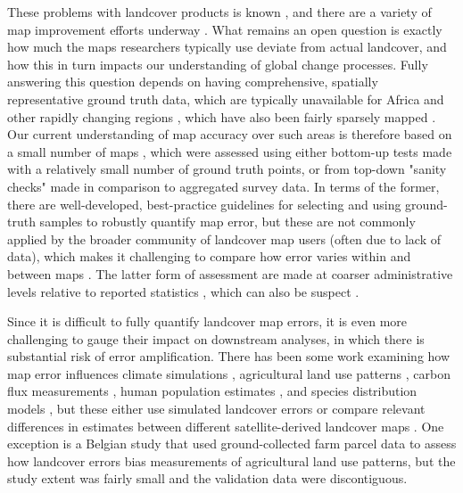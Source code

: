 \documentclass{pnastwo2}
\begin{document}
\begin{article}
These problems with landcover products is known \cite{fritz_comparison_2010, fritz_cropland_2011, see_improved_2015, fritz_mapping_2015,verburg_challenges_2011}, and there are a variety of map improvement efforts underway \cite[e.g.][]{fritz_geo-wiki:_2012, estes_platform_2015}. What remains an open question is exactly how much the maps researchers typically use deviate from actual landcover, and how this in turn impacts our understanding of global change processes. Fully answering this question depends on having comprehensive, spatially representative ground truth data, which are typically unavailable for Africa and other rapidly changing regions \cite{see_improved_2015}, which have also been fairly sparsely mapped \cite{yu_meta-discoveries_2014}. Our current understanding of map accuracy over such areas is therefore based on a small number of maps \cite{yu_meta-discoveries_2014}, which were assessed using either bottom-up tests made with a relatively small number of ground truth points, or from top-down "sanity checks" made in comparison to aggregated survey data.  In terms of the former, there are well-developed, best-practice guidelines for selecting and using ground-truth samples to robustly quantify map error, but these are not commonly applied by the broader community of landcover map users (often due to lack of data), which makes it challenging to compare how error varies within and between maps \cite{stehman_global_2012, olofsson_making_2013,olofsson_good_2014,foody_status_2002}. The latter form of assessment are made at coarser administrative levels relative to reported statistics \cite[e.g.][]{fritz_comparison_2010}, which can also be suspect \cite{carletto_emperor_2013,fao_action_2013}. 

Since it is difficult to fully quantify landcover map errors, it is even more challenging to gauge their impact on downstream analyses, in which there is substantial risk of error amplification\cite{kuemmerle_challenges_2013}. There has been some work examining how map error influences climate simulations \cite{ge_impacts_2007}, agricultural land use patterns \cite{schmit_limitations_2006}, carbon flux measurements \cite{quaife_impact_2008}, human population estimates \cite{linard_assessing_2010}, and species distribution models \cite{tuanmu_global_2014}, but these either use simulated landcover errors \cite{ge_impacts_2007} or compare relevant differences in estimates between different satellite-derived landcover maps \cite{linard_assessing_2010, quaife_impact_2008,tuanmu_global_2014}. One exception is a Belgian study \cite{schmit_limitations_2006} that used ground-collected farm parcel data to assess how landcover errors bias measurements of agricultural land use patterns, but the study extent was fairly small and the validation data were discontiguous. 


\end{article}
\end{document}
